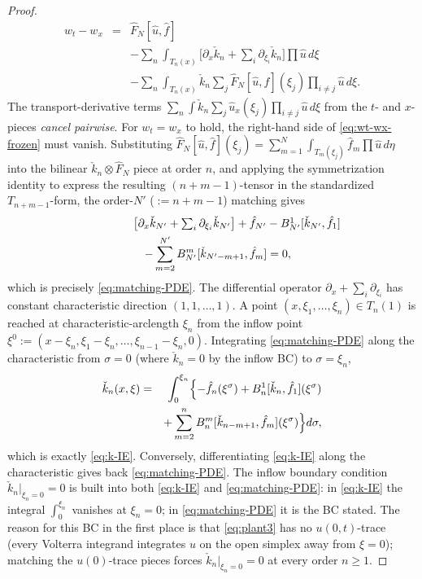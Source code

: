 \documentclass[journal,twoside,web]{ieeecolor}
\begin{document}
\begin{proof}
\begin{eqnarray}
w_t-w_x &=& \hat F_N[\hat u,\hat f] \nonumber\\
&& -\sum_n\!\int_{T_n(x)}\!\!\bigl[\partial_x\check k_n+\textstyle\sum_i\partial_{\xi_i}\check k_n\bigr]\prod\hat u\,d\xi \nonumber\\
&& -\sum_n\!\int_{T_n(x)}\!\!\check k_n\sum_j\hat F_N[\hat u,\hat f](\xi_j)\!\prod_{i\ne j}\!\hat u\,d\xi. \label{eq:wt-wx-frozen}
\end{eqnarray}
The transport-derivative terms $\sum_n\int\check k_n\sum_j\hat u_x(\xi_j)\prod_{i\ne j}\hat u\,d\xi$ from the $t$- and $x$-pieces \emph{cancel pairwise}.
For $w_t=w_x$ to hold, the right-hand side of \eqref{eq:wt-wx-frozen} must vanish. Substituting $\hat F_N[\hat u,\hat f](\xi_j)=\sum_{m=1}^N\int_{T_m(\xi_j)}\hat f_m\prod\hat u\,d\eta$ into the bilinear $\check k_n\otimes\hat F_N$ piece at order $n$, and applying the symmetrization identity \cite[Lemma~A.1]{HV1} to express the resulting $(n+m-1)$-tensor in the standardized $T_{n+m-1}$-form, the order-$N'$ ($:=n+m-1$) matching gives
\begin{eqnarray}
\lefteqn{\bigl[\partial_x\check k_{N'}+\textstyle\sum_i\partial_{\xi_i}\check k_{N'}\bigr]+\hat f_{N'}-B^1_{N'}[\check k_{N'},\hat f_1]} \nonumber\\
&& -\sum_{m=2}^{N'}B^m_{N'}[\check k_{N'-m+1},\hat f_m]=0, \label{eq:matching-collected}
\end{eqnarray}
which is precisely \eqref{eq:matching-PDE}.
The differential operator $\partial_x+\sum_i\partial_{\xi_i}$ has constant characteristic direction $(1,1,\ldots,1)$. A point $(x,\xi_1,\ldots,\xi_n)\in T_n(1)$ is reached at characteristic-arclength $\xi_n$ from the inflow point $\xi^0:=(x-\xi_n,\xi_1-\xi_n,\ldots,\xi_{n-1}-\xi_n,0)$. Integrating \eqref{eq:matching-PDE} along the characteristic from $\sigma=0$ (where $\check k_n=0$ by the inflow BC) to $\sigma=\xi_n$,
\begin{eqnarray}
\check k_n(x,\xi) &=& \int_0^{\xi_n}\Bigl\{-\hat f_n(\xi^\sigma)+B^1_n[\check k_n,\hat f_1](\xi^\sigma) \nonumber\\
&& +\sum_{m=2}^n B^m_n[\check k_{n-m+1},\hat f_m](\xi^\sigma)\Bigr\}d\sigma, \label{eq:char-integration}
\end{eqnarray}
which is exactly \eqref{eq:k-IE}. Conversely, differentiating \eqref{eq:k-IE} along the characteristic gives back \eqref{eq:matching-PDE}.
The inflow boundary condition $\check k_n|_{\xi_n=0}=0$ is built into both \eqref{eq:k-IE} and \eqref{eq:matching-PDE}: in \eqref{eq:k-IE} the integral $\int_0^{\xi_n}$ vanishes at $\xi_n=0$; in \eqref{eq:matching-PDE} it is the BC stated. The  reason for this BC in the first place is that \eqref{eq:plant3} has no $u(0,t)$-trace (every Volterra integrand integrates $u$ on the open simplex away from $\xi=0$); matching the $u(0)$-trace pieces forces $\check k_n|_{\xi_n=0}=0$ at every order $n\ge 1$.
\end{proof}
\end{document}
